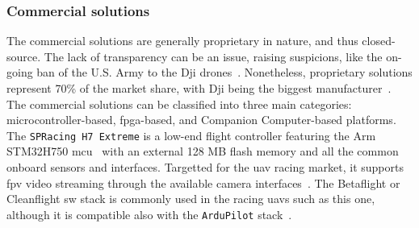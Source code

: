 \subsubsection{Commercial solutions}%
\label{sec:commercial-solutions-hw}
The commercial solutions are generally proprietary in nature, and thus closed-source. The
lack of transparency can be an issue, raising suspicions, like the on-going ban
of the U.S. Army to the Dji
drones~\cite{suasNewsDjiDronesBanned2017,djiBan2022}. Nonetheless, proprietary
solutions represent 70\% of the market share, with Dji being the biggest
manufacturer~\cite{droneAnalyst2021}.
%
The commercial solutions can be classified into three main categories: microcontroller-based, \gls{fpga}-based, and Companion Computer-based
platforms.
The \lstinline{SPRacing H7 Extreme} is a low-end flight controller featuring the
Arm STM32H750 \gls{mcu}~\cite{spRacing}
with an external 128 MB flash
memory and all the common onboard sensors and interfaces. Targetted for the \gls{uav} racing market, it supports \gls{fpv} video
streaming through the available camera interfaces~\cite{spRacing}. The
Betaflight or Cleanflight \gls{sw} stack is commonly used in the racing
\glspl{uav} such as this one, although it is compatible also with the \lstinline{ArduPilot} stack~\cite{arduPilot-SPRacing}.

%  

%

